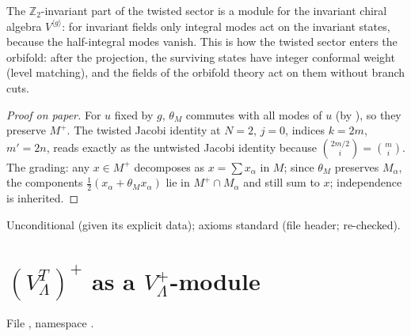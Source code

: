 \begin{physics}
The $\mathbb Z_2$-invariant part of the twisted sector is a module for the invariant chiral algebra $V^{\langle g\rangle}$: for invariant fields only integral modes act on the invariant states, because the half-integral modes vanish. This is how the twisted sector enters the orbifold: after the projection, the surviving states have integer conformal weight (level matching), and the fields of the orbifold theory act on them without branch cuts.
\end{physics}
\begin{proof}[Proof on paper]
For $u$ fixed by $g$, $\theta_M$ commutes with all modes of $u$ (by ), so they preserve
$M^+$.  The twisted Jacobi identity at $N=2$, $j=0$, indices $k=2m$, $m'=2n$, reads exactly as the
untwisted Jacobi identity because $\binom{2m/2}{i}=\binom mi$.  The grading: any $x\in M^+$
decomposes as $x=\sum x_\alpha$ in $M$; since $\theta_M$ preserves $M_\alpha$, the components
$\frac12(x_\alpha+\theta_Mx_\alpha)$ lie in $M^+\cap M_\alpha$ and still sum to $x$; independence is
inherited.
\end{proof}
\begin{status}
Unconditional (given its explicit data); axioms standard (file header; 
re-checked).
\end{status}

\section{\texorpdfstring{$(V_\Lambda^T)^+$}{The twisted plus part} as a \texorpdfstring{$V_\Lambda^+$}{V Lambda plus}-module}\label{ch08:sec:leechplus}

File , namespace .

